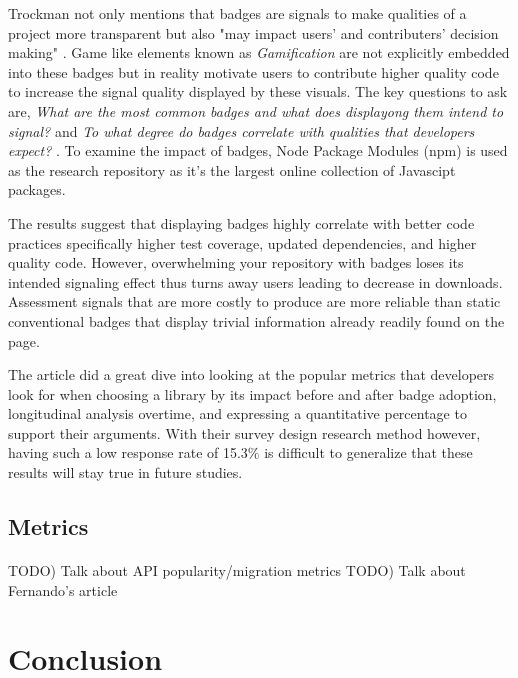 \documentclass[12pt]{article}
\begin{document}
Trockman not only mentions that badges are signals to make qualities of a project more transparent but also "may impact users' and contributers' decision making" \cite{githubbadges}.
Game like elements known as \textit{Gamification} are not explicitly embedded into these badges but in reality motivate users to contribute higher quality code to increase the signal quality
displayed by these visuals. 
The key questions to ask are, \textit{What are the most common badges and what does displayong them intend to signal?} and \textit{To what degree do badges correlate with qualities that developers expect?} \cite{githubbadges}.
To examine the impact of badges, Node Package Modules (npm) \cite{npm} is used as the research repository as it's the largest online collection of Javascipt packages. 


The results suggest that displaying badges highly correlate with better code practices specifically higher test coverage, updated dependencies, and higher quality code.
However, overwhelming your repository with badges loses its intended signaling effect thus turns away users leading to decrease in downloads.
Assessment signals that are more costly to produce are more reliable than static conventional badges that display trivial information already readily found on the page.

The article did a great dive into looking at the popular metrics that developers look for when choosing a library
by its impact before and after badge adoption, longitudinal analysis overtime, and expressing a quantitative percentage
to support their arguments. With their survey design research method however, having such a low response rate of 15.3\% 
is difficult to generalize that these results will stay true in future studies.





\newpage
\subsection{Metrics}
\paragraph{}
TODO) Talk about API popularity/migration metrics
TODO) Talk about Fernando's article

\newpage 
\section{Conclusion}


\newpage


\end{document}
